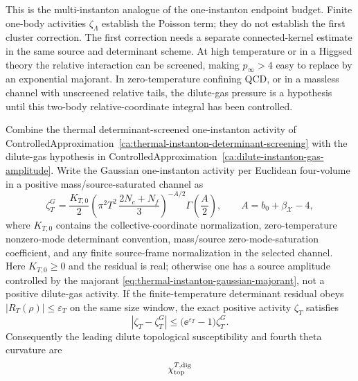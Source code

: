 \begin{controlledapproximation}
This is the multi-instanton analogue of the one-instanton endpoint budget.
Finite one-body activities \(\zeta_\Lambda\) establish the Poisson term; they
do not establish the first cluster correction.  The first correction needs a
separate connected-kernel estimate in the same source and determinant scheme.
At high temperature or in a Higgsed theory the relative interaction can be
screened, making \(p_\infty>4\) easy to replace by an exponential majorant.
In zero-temperature confining QCD, or in a massless channel with unscreened
relative tails, the dilute-gas pressure is a hypothesis until this
two-body relative-coordinate integral has been controlled.
\end{controlledapproximation}

\begin{controlledapproximation}
\label{ca:thermal-dilute-instanton-susceptibility}
Combine the thermal determinant-screened one-instanton activity of
ControlledApproximation~\ref{ca:thermal-instanton-determinant-screening} with
the dilute-gas hypothesis in
ControlledApproximation~\ref{ca:dilute-instanton-gas-amplitude}.  Write the
Gaussian one-instanton activity per Euclidean four-volume in a positive
mass/source-saturated channel as
\begin{equation}
  \zeta_T^{G}
  =
  \frac{K_{T,0}}{2}
  \left(\pi^2T^2\,\frac{2N_c+N_f}{3}\right)^{-A/2}
  \Gamma\!\left(\frac A2\right),
  \qquad
  A=b_0+\beta_{\mathcal X}-4,
  \label{eq:thermal-dilute-gaussian-activity}
\end{equation}
where \(K_{T,0}\) contains the collective-coordinate normalization,
zero-temperature nonzero-mode determinant convention, mass/source
zero-mode-saturation coefficient, and any finite source-frame normalization in
the selected channel.  Here \(K_{T,0}\ge0\) and the residual is real; otherwise
one has a source amplitude controlled by the majorant
\eqref{eq:thermal-instanton-gaussian-majorant}, not a positive dilute-gas
activity.  If the finite-temperature determinant residual obeys
\(|R_T(\rho)|\le\varepsilon_T\) on the same size window, the exact positive
activity \(\zeta_T\) satisfies
\begin{equation}
  \left|\zeta_T-\zeta_T^{G}\right|
  \le
  \bigl(\ee^{\varepsilon_T}-1\bigr)\zeta_T^{G}.
  \label{eq:thermal-dilute-activity-residual}
\end{equation}
Consequently the leading dilute topological susceptibility and fourth theta
curvature are
\begin{equation}
  \chi_{\rm top}^{T,{\rm dig}}

\end{equation}
\end{controlledapproximation}
